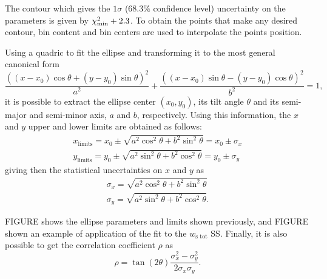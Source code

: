 The contour which gives the \(1\sigma\) (\(68.3\%\) confidence level) uncertainty on the parameters is given by \(\chi^{2}_{\text{min}} + 2.3\). 
To obtain the points that make any desired contour, bin content and bin centers are used to interpolate the points position.

Using a quadric to fit the ellipse and transforming it to the most general canonical form
\begin{equation}
    \frac{((x-x_0)\cos\theta + (y-y_0)\sin\theta)^2}{a^2} + \frac{((x-x_0)\sin\theta - (y-y_0)\cos\theta)^2}{b^2} = 1,
\end{equation}
it is possible to extract the ellipse center \((x_0, y_0)\), its tilt angle \(\theta\) and its semi-major and semi-minor axis, \(a\) and \(b\), respectively.
Using this information, the \(x\) and \(y\) upper and lower limits are obtained as follows:
\begin{gather}
    x_{\text{limits}} = x_0 \pm \sqrt{a^2 \cos^2\theta + b^2 \sin^2\theta} = x_0 \pm \sigma_x\\
    y_{\text{limits}} = y_0 \pm \sqrt{a^2 \sin^2\theta + b^2 \cos^2\theta} = y_0 \pm \sigma_y
\end{gather}
giving then the statistical uncertainties on \(x\) and \(y\) as
\begin{gather}
    \sigma_x = \sqrt{a^2 \cos^2\theta + b^2 \sin^2\theta}\\
    \sigma_y = \sqrt{a^2 \sin^2\theta + b^2 \cos^2\theta}.
\end{gather}



FIGURE shows the ellipse parameters and limits shown previously, and FIGURE shown an example of application of the fit to the \(w_{\text{s tot}}\) \ac{SS}.
Finally, it is also possible to get the correlation coefficient \(\rho\) as
\begin{equation}
    \rho = \tan(2\theta) \frac{\sigma_{x}^2-\sigma_{y}^2}{2\sigma_{x}\sigma_{y}}.
\end{equation}


